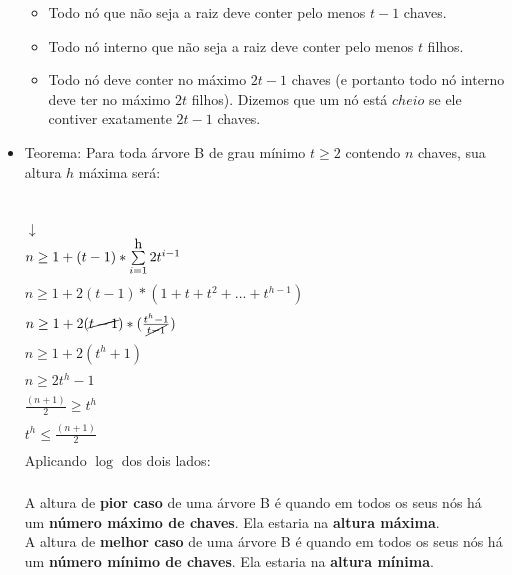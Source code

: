 \documentclass[a4paper, 12pt]{article}
\begin{document}
\begin{itemize}
\begin{itemize}
\item Todo nó que não seja a raiz deve conter pelo menos $t - 1$ chaves.
\item Todo nó interno que não seja a raiz deve conter pelo menos $t$ filhos.
\item Todo nó deve conter no máximo $2t - 1$ chaves (e portanto todo nó interno deve ter no máximo $2t$ filhos). Dizemos que um nó está $cheio$ se ele contiver exatamente $2t - 1$ chaves.
\end{itemize}



\item {} Teorema: Para toda árvore B de grau mínimo $t \geq 2$ contendo $n$ chaves, sua altura $h$ máxima será:\\

\begin{center}
\\
\textcolor{white}{$\rightarrow$}\\
\color{RawSienna}
$\downarrow$\\
$n \geq 1 + (t-1) * \sum\limits_{i=1}^{\mbox h}2t^{i-1}$\\
\textcolor{white}{$\rightarrow$}\\
$n \geq 1 + 2(t-1) * (1 + t + t^2 + ... + t^{h-1})$\\
\textcolor{white}{$\rightarrow$}\\
$n \geq 1 + 2(\cancel{t-1}) * (\frac{t^h-1}{\cancel{t-1}})$\\
\textcolor{white}{$\rightarrow$}\\
$n \geq 1 + 2(t^h+1)$\\
\textcolor{white}{$\rightarrow$}\\
$n \geq 2t^h-1$\\
\textcolor{white}{$\rightarrow$}\\
$\frac{(n+1)}{2} \geq t^h$\\
\textcolor{white}{$\rightarrow$}\\
$t^h \leq \frac{(n+1)}{2}$\\
\textcolor{white}{$\rightarrow$}\\
\color{black}
Aplicando $\log$ dos dois lados:\\
\textcolor{white}{$\rightarrow$}\\
\end{center}

A altura de \textbf{pior caso} de uma árvore B é quando em todos os seus nós há um \textbf{número máximo de chaves}. Ela estaria na \textbf{altura máxima}.\\

A altura de \textbf{melhor caso} de uma árvore B é quando em todos os seus nós há um \textbf{número mínimo de chaves}. Ela estaria na \textbf{altura mínima}.

\end{itemize}
\end{document}
